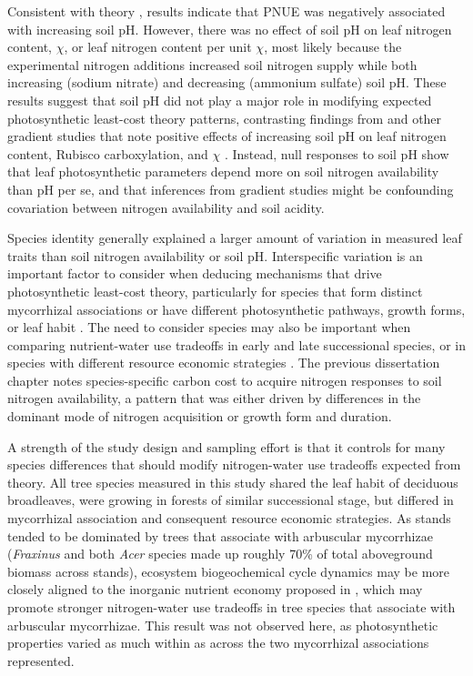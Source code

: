 Consistent with theory , results indicate that PNUE was negatively associated with increasing soil pH. However, there was no effect of soil pH on leaf nitrogen content, $\chi$, or leaf nitrogen content per unit $\chi$, most likely because the experimental nitrogen additions increased soil nitrogen supply while both increasing (sodium nitrate) and decreasing (ammonium sulfate) soil pH. These results suggest that soil pH did not play a major role in modifying expected photosynthetic least-cost theory patterns, contrasting findings from  and other gradient studies that note positive effects of increasing soil pH on leaf nitrogen content, Rubisco carboxylation, and $\chi$ . Instead, null responses to soil pH show that leaf photosynthetic parameters depend more on soil nitrogen availability than pH per se, and that inferences from gradient studies might be confounding covariation between nitrogen availability and soil acidity.

Species identity generally explained a larger amount of variation in measured leaf traits than soil nitrogen availability or soil pH. Interspecific variation is an important factor to consider when deducing mechanisms that drive photosynthetic least-cost theory, particularly for species that form distinct mycorrhizal associations or have different photosynthetic pathways, growth forms, or leaf habit . The need to consider species may also be important when comparing nutrient-water use tradeoffs in early and late successional species, or in species with different resource economic strategies . The previous dissertation chapter notes species-specific carbon cost to acquire nitrogen responses to soil nitrogen availability, a pattern that was either driven by differences in the dominant mode of nitrogen acquisition or growth form and duration.
    
A strength of the study design and sampling effort is that it controls for many species differences that should modify nitrogen-water use tradeoffs expected from theory. All tree species measured in this study shared the leaf habit of deciduous broadleaves, were growing in forests of similar successional stage, but differed in mycorrhizal association and consequent resource economic strategies. As stands tended to be dominated by trees that associate with arbuscular mycorrhizae (\textit{Fraxinus} and both \textit{Acer} species made up roughly 70\% of total aboveground biomass across stands), ecosystem biogeochemical cycle dynamics may be more closely aligned to the inorganic nutrient economy proposed in , which may promote stronger nitrogen-water use tradeoffs in tree species that associate with arbuscular mycorrhizae. This result was not observed here, as photosynthetic properties varied as much within as across the two mycorrhizal associations represented.
    
